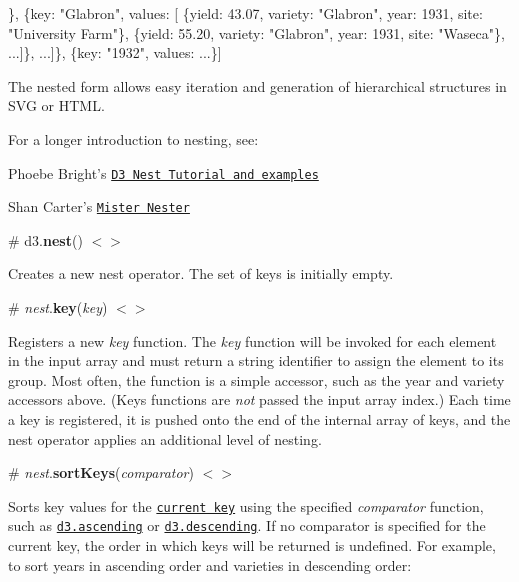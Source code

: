 \begin{DoxyCode}
[\{key: "1931", values: [
   \{key: "Manchuria", values: [
     \{yield: 27.00, variety: "Manchuria", year: 1931, site: "University Farm"\},
     \{yield: 48.87, variety: "Manchuria", year: 1931, site: "Waseca"\},
     \{yield: 27.43, variety: "Manchuria", year: 1931, site: "Morris"\}, ...]\},
   \{key: "Glabron", values: [
     \{yield: 43.07, variety: "Glabron", year: 1931, site: "University Farm"\},
     \{yield: 55.20, variety: "Glabron", year: 1931, site: "Waseca"\}, ...]\}, ...]\},
 \{key: "1932", values: ...\}]
\end{DoxyCode}


The nested form allows easy iteration and generation of hierarchical structures in S\+VG or H\+T\+ML.

For a longer introduction to nesting, see\+:


\begin{DoxyItemize}
\item Phoebe Bright’s \href{http://bl.ocks.org/phoebebright/raw/3176159/}{\tt D3 Nest Tutorial and examples}
\item Shan Carter’s \href{http://bl.ocks.org/shancarter/raw/4748131/}{\tt Mister Nester}
\end{DoxyItemize}

\label{_nest}%
\# d3.{\bfseries nest}() \href{https://github.com/d3/d3-collection/blob/master/src/nest.js}{\tt $<$$>$}

Creates a new nest operator. The set of keys is initially empty.

\label{_nest_key}%
\# {\itshape nest}.{\bfseries key}({\itshape key}) \href{https://github.com/d3/d3-collection/blob/master/src/nest.js#L4}{\tt $<$$>$}

Registers a new {\itshape key} function. The {\itshape key} function will be invoked for each element in the input array and must return a string identifier to assign the element to its group. Most often, the function is a simple accessor, such as the year and variety accessors above. (Keys functions are {\itshape not} passed the input array index.) Each time a key is registered, it is pushed onto the end of the internal array of keys, and the nest operator applies an additional level of nesting.

\label{_nest_sortKeys}%
\# {\itshape nest}.{\bfseries sort\+Keys}({\itshape comparator}) \href{https://github.com/d3/d3-collection/blob/master/src/nest.js#L5}{\tt $<$$>$}

Sorts key values for the \href{#nest_key}{\tt current key} using the specified {\itshape comparator} function, such as \href{https://github.com/d3/d3-array#ascending}{\tt d3.\+ascending} or \href{https://github.com/d3/d3-array#descending}{\tt d3.\+descending}. If no comparator is specified for the current key, the order in which keys will be returned is undefined. For example, to sort years in ascending order and varieties in descending order\+:


